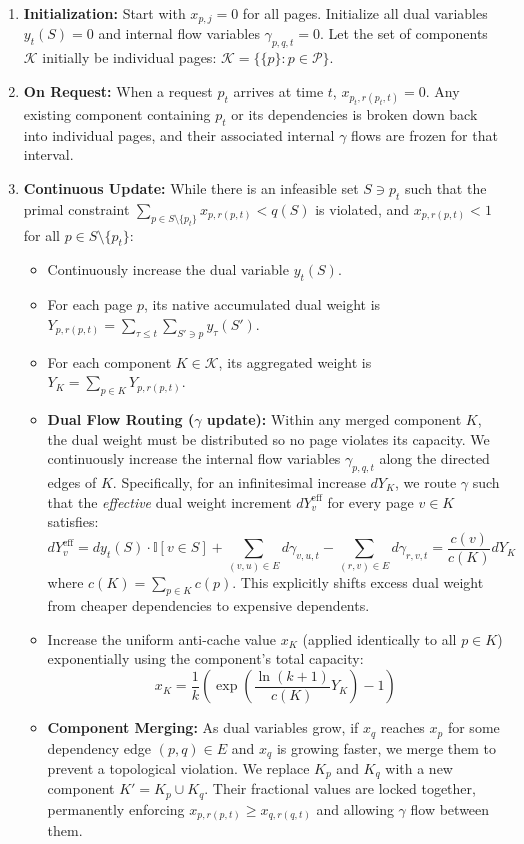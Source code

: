 \documentclass[a4paper]{article}
\begin{document}
\begin{enumerate}
    \item \textbf{Initialization:} Start with $x_{p,j} = 0$ for all pages. Initialize all dual variables $y_t(S) = 0$ and internal flow variables $\gamma_{p,q,t} = 0$. Let the set of components $\mathcal{K}$ initially be individual pages: $\mathcal{K} = \{ \{p\} : p \in \mathcal{P} \}$.
    \item \textbf{On Request:} When a request $p_t$ arrives at time $t$, $x_{p_t, r(p_t,t)} = 0$. Any existing component containing $p_t$ or its dependencies is broken down back into individual pages, and their associated internal $\gamma$ flows are frozen for that interval.
    \item \textbf{Continuous Update:} While there is an infeasible set $S \ni p_t$ such that the primal constraint $\sum_{p \in S \setminus \{p_t\}} x_{p,r(p,t)} < q(S)$ is violated, and $x_{p,r(p,t)} < 1$ for all $p \in S \setminus \{p_t\}$:
    \begin{itemize}
        \item Continuously increase the dual variable $y_t(S)$.
        \item For each page $p$, its native accumulated dual weight is $Y_{p, r(p,t)} = \sum_{\tau \le t} \sum_{S' \ni p} y_\tau(S')$.
        \item For each component $K \in \mathcal{K}$, its aggregated weight is $Y_K = \sum_{p \in K} Y_{p, r(p,t)}$.
        \item \textbf{Dual Flow Routing ($\gamma$ update):} Within any merged component $K$, the dual weight must be distributed so no page violates its capacity. We continuously increase the internal flow variables $\gamma_{p,q,t}$ along the directed edges of $K$. Specifically, for an infinitesimal increase $dY_K$, we route $\gamma$ such that the \textit{effective} dual weight increment $dY_v^{\text{eff}}$ for every page $v \in K$ satisfies:
        $$ dY_v^{\text{eff}} = dy_t(S)\cdot \mathbb{I}[v \in S] + \sum_{(v,u) \in E} d\gamma_{v,u,t} - \sum_{(r,v) \in E} d\gamma_{r,v,t} = \frac{c(v)}{c(K)} dY_K $$
        where $c(K) = \sum_{p \in K} c(p)$. This explicitly shifts excess dual weight from cheaper dependencies to expensive dependents.
        \item Increase the uniform anti-cache value $x_K$ (applied identically to all $p \in K$) exponentially using the component's total capacity:
        $$ x_K = \frac{1}{k} \left( \exp\left( \frac{\ln(k+1)}{c(K)} Y_K \right) - 1 \right) $$
        \item \textbf{Component Merging:} As dual variables grow, if $x_q$ reaches $x_p$ for some dependency edge $(p,q) \in E$ and $x_q$ is growing faster, we merge them to prevent a topological violation. We replace $K_p$ and $K_q$ with a new component $K' = K_p \cup K_q$. Their fractional values are locked together, permanently enforcing $x_{p,r(p,t)} \ge x_{q,r(q,t)}$ and allowing $\gamma$ flow between them.
    \end{itemize}
\end{enumerate}
\end{document}
